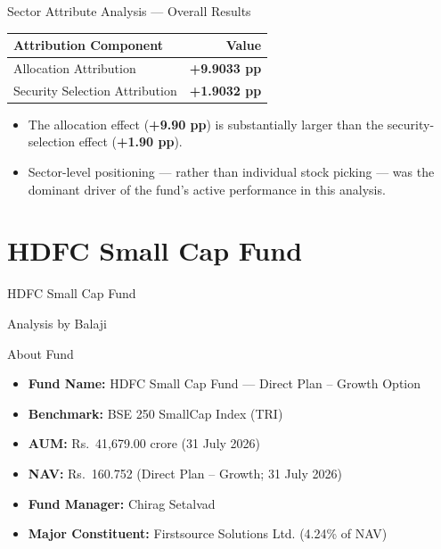 \documentclass[11pt, aspectratio=43]{beamer}
\begin{document}
\begin{frame}{Sector Attribute Analysis --- Overall Results}
\centering
\small
\begin{tabular}{l r}
\toprule
\textbf{Attribution Component} & \textbf{Value} \\
\midrule
Allocation Attribution & \textbf{+9.9033 pp} \\
Security Selection Attribution & \textbf{+1.9032 pp} \\
\bottomrule
\end{tabular}

\vspace{1em}
\begin{itemize}
    \small
    \item The allocation effect (\textbf{+9.90 pp}) is substantially larger than the security-selection effect (\textbf{+1.90 pp}).
    \item Sector-level positioning --- rather than individual stock picking --- was the dominant driver of the fund's active performance in this analysis.
\end{itemize}
\end{frame}

\section{HDFC Small Cap Fund} %

\begin{frame}{}
\centering
\vspace{2em}
{\huge HDFC Small Cap Fund}

\vspace{1.5em}
{\large Analysis by Balaji}

\end{frame}

\begin{frame}{About Fund}
\begin{itemize}
    \item \textbf{Fund Name:} HDFC Small Cap Fund --- Direct Plan -- Growth Option
    \item \textbf{Benchmark:} BSE 250 SmallCap Index (TRI)
    \item \textbf{AUM:} Rs.\ 41,679.00 crore (31 July 2026)
    \item \textbf{NAV:} Rs.\ 160.752 (Direct Plan -- Growth; 31 July 2026)
    \item \textbf{Fund Manager:} Chirag Setalvad
    \item \textbf{Major Constituent:} Firstsource Solutions Ltd. (4.24\% of NAV)
\end{itemize}
\end{frame}
\end{document}
